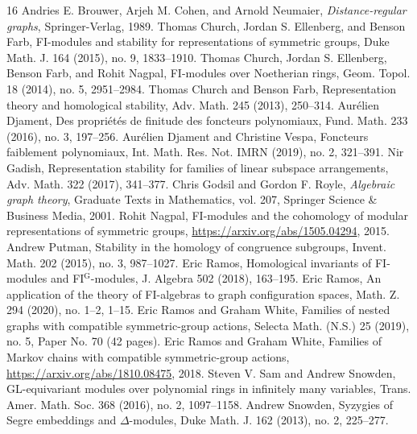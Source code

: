\documentclass[10pt]{amsart}
\theoremstyle{definition}
\begin{document}
\begin{thebibliography}{16}
 Andries E. Brouwer, Arjeh M. Cohen, and Arnold Neumaier, \emph{Distance-regular graphs}, Springer-Verlag, 1989.
 Thomas Church, Jordan S. Ellenberg, and Benson Farb, FI-modules and stability for representations of symmetric groups, Duke Math. J. 164 (2015), no. 9, 1833--1910.
 Thomas Church, Jordan S. Ellenberg, Benson Farb, and Rohit Nagpal, FI-modules over Noetherian rings, Geom. Topol. 18 (2014), no. 5, 2951--2984.
 Thomas Church and Benson Farb, Representation theory and homological stability, Adv. Math. 245 (2013), 250--314.
 Aurélien Djament, Des propriétés de finitude des foncteurs polynomiaux, Fund. Math. 233 (2016), no. 3, 197--256.
 Aurélien Djament and Christine Vespa, Foncteurs faiblement polynomiaux, Int. Math. Res. Not. IMRN (2019), no. 2, 321--391.
 Nir Gadish, Representation stability for families of linear subspace arrangements, Adv. Math. 322 (2017), 341--377.
 Chris Godsil and Gordon F. Royle, \emph{Algebraic graph theory}, Graduate Texts in Mathematics, vol. 207, Springer Science \& Business Media, 2001.
 Rohit Nagpal, FI-modules and the cohomology of modular representations of symmetric groups, \url{https://arxiv.org/abs/1505.04294}, 2015.
 Andrew Putman, Stability in the homology of congruence subgroups, Invent. Math. 202 (2015), no. 3, 987--1027.
 Eric Ramos, Homological invariants of FI-modules and FI$^\mathrm{G}$-modules, J. Algebra 502 (2018), 163--195.
 Eric Ramos, An application of the theory of FI-algebras to graph configuration spaces, Math. Z. 294 (2020), no. 1--2, 1--15.
 Eric Ramos and Graham White, Families of nested graphs with compatible symmetric-group actions, Selecta Math. (N.S.) 25 (2019), no. 5, Paper No. 70 (42 pages).
 Eric Ramos and Graham White, Families of Markov chains with compatible symmetric-group actions, \url{https://arxiv.org/abs/1810.08475}, 2018.
 Steven V. Sam and Andrew Snowden, GL-equivariant modules over polynomial rings in infinitely many variables, Trans. Amer. Math. Soc. 368 (2016), no. 2, 1097--1158.
 Andrew Snowden, Syzygies of Segre embeddings and $\Delta$-modules, Duke Math. J. 162 (2013), no. 2, 225--277.
\end{thebibliography}
\end{document}
